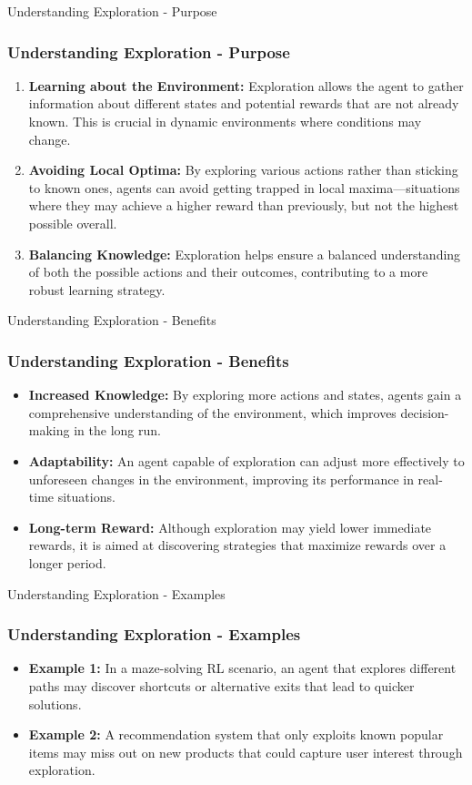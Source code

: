 \documentclass[aspectratio=169]{beamer}
\begin{document}
\begin{frame}[fragile]{Understanding Exploration - Purpose}
    \frametitle{Understanding Exploration - Purpose}
    \begin{enumerate}
        \item \textbf{Learning about the Environment:} Exploration allows the agent to gather information about different states and potential rewards that are not already known. This is crucial in dynamic environments where conditions may change.
        
        \item \textbf{Avoiding Local Optima:} By exploring various actions rather than sticking to known ones, agents can avoid getting trapped in local maxima—situations where they may achieve a higher reward than previously, but not the highest possible overall.
        
        \item \textbf{Balancing Knowledge:} Exploration helps ensure a balanced understanding of both the possible actions and their outcomes, contributing to a more robust learning strategy.
    \end{enumerate}
\end{frame}

\begin{frame}[fragile]{Understanding Exploration - Benefits}
    \frametitle{Understanding Exploration - Benefits}
    \begin{itemize}
        \item \textbf{Increased Knowledge:} By exploring more actions and states, agents gain a comprehensive understanding of the environment, which improves decision-making in the long run.
        \item \textbf{Adaptability:} An agent capable of exploration can adjust more effectively to unforeseen changes in the environment, improving its performance in real-time situations.
        \item \textbf{Long-term Reward:} Although exploration may yield lower immediate rewards, it is aimed at discovering strategies that maximize rewards over a longer period.
    \end{itemize}
\end{frame}

\begin{frame}[fragile]{Understanding Exploration - Examples}
    \frametitle{Understanding Exploration - Examples}
    \begin{itemize}
        \item \textbf{Example 1:} In a maze-solving RL scenario, an agent that explores different paths may discover shortcuts or alternative exits that lead to quicker solutions.
        \item \textbf{Example 2:} A recommendation system that only exploits known popular items may miss out on new products that could capture user interest through exploration.
    \end{itemize}
\end{frame}
\end{document}
